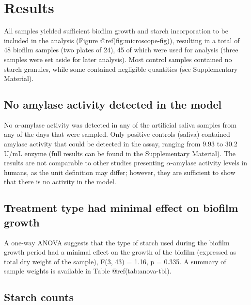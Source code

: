 \documentclass[
  letterpaper,
]{book}
\begin{document}

\hypertarget{results}{%
\chapter{Results}\label{results}}

All samples yielded sufficient biofilm growth and starch incorporation
to be included in the analysis (Figure @ref(fig:microscope-fig)),
resulting in a total of 48 biofilm samples (two plates of 24), 45 of
which were used for analysis (three samples were set aside for later
analysis). Most control samples contained no starch granules, while some
contained negligible quantities (see Supplementary Material).

\hypertarget{no-amylase-activity-detected-in-the-model}{%
\section{No amylase activity detected in the
model}\label{no-amylase-activity-detected-in-the-model}}

No \(\alpha\)-amylase activity was detected in any of the artificial
saliva samples from any of the days that were sampled. Only positive
controls (saliva) contained amylase activity that could be detected in
the assay, ranging from 9.93 to 30.2 U/mL enzyme (full results can be
found in the Supplementary Material). The results are not comparable to
other studies presenting \(\alpha\)-amylase activity levels in humans,
as the unit definition may differ; however, they are sufficient to show
that there is no activity in the model.

\hypertarget{treatment-type-had-minimal-effect-on-biofilm-growth}{%
\section{Treatment type had minimal effect on biofilm
growth}\label{treatment-type-had-minimal-effect-on-biofilm-growth}}

A one-way ANOVA suggests that the type of starch used during the biofilm
growth period had a minimal effect on the growth of the biofilm
(expressed as total dry weight of the sample), F(3, 43) = 1.16, p =
0.335. A summary of sample weights is available in Table
@ref(tab:anova-tbl).

\hypertarget{starch-counts}{%
\section{Starch counts}\label{starch-counts}}
\end{document}

